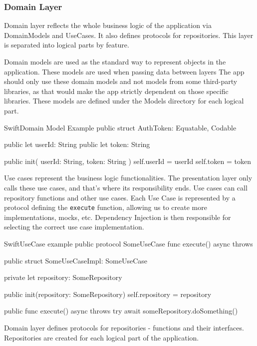 \documentclass[
  biblatex,
  language=english,
  figures=false,
  sourcecodes,
  glossaries,
  index
]{kidiplom}
\begin{document}
\subsubsection{Domain Layer}
Domain layer reflects the whole business logic of the application via DomainModels and UseCases. It also defines protocols for repositories. This layer is separated into logical parts by feature.

Domain models are used as the standard way to represent objects in the application. These models are used when passing data between layers
The app should only use these domain models and not models from some third-party libraries, as that would make the app strictly dependent on those specific libraries.  These models are defined under the Models directory for each logical part.

\begin{kicode}{Swift}{}{Domain Model Example}
public struct AuthToken: Equatable, Codable {
    public let userId: String
    public let token: String
    
    public init(
        userId: String,
        token: String
    ) {
        self.userId = userId
        self.token = token
    }
}
\end{kicode}

Use cases represent the business logic functionalities. The presentation layer only calls these use cases, and that's where its responsibility ends. Use cases can call repository functions and other use cases. Each Use Case is represented by a protocol defining the \texttt{execute} function, allowing us to create more implementations, mocks, etc. Dependency Injection is then responsible for selecting the correct use case implementation. 

\begin{kicode}{Swift}{}{UseCase example}
public protocol SomeUseCase {
    func execute() async throws
}

public struct SomeUseCaseImpl: SomeUseCase {
    
    private let repository: SomeRepository
    
    public init(repository: SomeRepository) {
        self.repository = repository
    }
    
    public func execute() async throws {
        try await someRepository.doSomething()
    }
}
\end{kicode}

Domain layer defines protocols for repositories - functions and their interfaces. Repositories are created for each logical part of the application.
\end{document}
